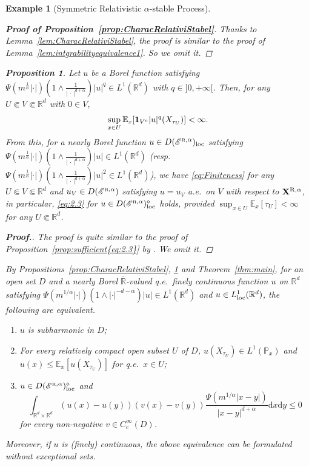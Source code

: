 \documentclass[12pt,a4paper]{article}
\newtheorem{prop}[thm]{Proposition}
\newtheorem{example}[thm]{Example}
\renewcommand{\P}{\mathbb{P}}
\newcommand{\E}{\mathbb{E}}
\newcommand{\R}{\mathbb{R}}
\renewcommand{\d}{\mathrm{d}}
\newcommand{\loc}{{\rm loc}}
\newcommand{\1}{{\bf 1}}
\begin{document}
\begin{example}[Symmetric Relativistic $\alpha$-stable Process]
\begin{proof}[\bf Proof of Proposition~\ref{prop:CharacRelativiStabel}]
Thanks to Lemma~\ref{lem:CharacRelativiStabel}, the proof is similar to 
the proof of Lemma~\ref{lem:intgrabilityequivalence1}. So we omit it.  
\end{proof}

\begin{prop}\label{prop:sufficient{eq:2.3}RelativisticStable} 
Let $u$ be a Borel function satisfying $\Psi(m^{\frac{1}{\alpha}}|\cdot|)\left(1\land \frac{1}{|\,\cdot\,|^{d+\alpha}} \right)|u|^q\in L^1(\R^d)$ with $q\in]0,+\infty[$. 
Then, for any $U\Subset V\Subset\R^d$ with $0\in V$, 
\begin{align}
\sup_{x\in U}\E_x[\1_{V^c}|u|^q(X_{\tau_U})]<\infty.\label{eq:1Rel}
\end{align}
From this, for a nearly Borel function $u\in D(\mathscr{E}^{\text{\tiny\rm R},\alpha})_{\loc}$ 
satisfying $\Psi(m^{\frac{1}{\alpha}}|\cdot|)\left(1\land \frac{1}{|\,\cdot\,|^{d+\alpha}} \right)|u|\in 
L^1(\R^d)$ {\rm(}resp.~$\Psi(m^{\frac{1}{\alpha}}|\cdot|)\left(1\land \frac{1}{|\,\cdot\,|^{d+\alpha}} \right)|u|^2\in L^1(\R^d)${\rm)}, we have \eqref{eq:Finiteness} 
for any $U\Subset V\Subset \R^d$ and $u_V\in D(\mathscr{E}^{\text{\tiny\rm R},\alpha})$ satisfying $u=u_V$ a.e.~on $V$ with respect to ${\bf X}^{{\rm\tiny R},\alpha}$, 
in particular, \eqref{eq:2.3} for $u\in D(\mathscr{E}^{\text{\tiny\rm R},\alpha})^{\diamond}_{\loc}$ holds, 
provided $\sup_{x\in U}\E_x[\tau_U]<\infty$ for any $U\Subset \R^d$.
\end{prop}
\begin{proof}[{\bf Proof.}]
The proof is quite similar to the proof of Proposition~\ref{prop:sufficient{eq:2.3}} by  
\cite[Lemma~4.1(2)]{KimKuwae:GeneralAnal}. 
We omit it. 
\end{proof}
By Propositions~\ref{prop:CharacRelativiStabel}, \ref{prop:sufficient{eq:2.3}RelativisticStable} and  Theorem~\ref{thm:main}, 
for an open set $D$ and a nearly Borel $\overline{\R}$-valued 
q.e.~finely continuous 
function $u$ on $\R^d$  
satisfying $\Psi(m^{1/\alpha}|\cdot|)(1\wedge |\cdot|^{-d-\alpha})|u|
\in L^1(\R^d)$ and $u\in L^1_{\loc}(\R^d)$, the following are equivalent.
\begin{enumerate}
\item\label{item:subharmstable1b} $u$ is subharmonic in $D$;
\item\label{item:subharmstable2b}
For  every relatively compact open subset $U$ of $D$, $u(X_{\tau_U})\in L^1(\P_x)$ and
$u(x)\leq\E_x[u(X_{\tau_U})]$ for q.e.~$x\in U$;
\item\label{item:subharmstable3b}
$u\in D(\mathscr{E}^{\text{\tiny\rm R},\alpha})^{\diamond}_{\loc}$ and
$$
\int_{\R^d\times\R^d}
(u(x)-u(y))(v(x)-v(y))\frac{\Psi(m^{1/\alpha}|x-y|)}{|x-y|^{d+\alpha}}{\d} x{\d} y\leq0
$$
for every non-negative $v\in C^\infty_c(D)$.
\end{enumerate}
Moreover, if $u$ is (finely) continuous, the above equivalence can  be formulated without exceptional sets.

\end{example}
\end{document}
